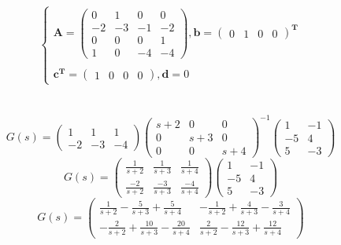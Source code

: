 \documentclass[UTF8,a4paper]{ctexart}
\begin{document}
\subsection{}
$$\begin{cases}
\mathbf{A}=\begin{pmatrix}
0&1&0&0\\
-2&-3&-1&-2\\
0&0&0&1\\
1&0&-4&-4\end{pmatrix},
\mathbf{b}=\begin{pmatrix} 0&1&0&0\end{pmatrix}^\mathbf{T} \\ \\ 
\mathbf{c}^\mathbf{T}=\begin{pmatrix} 1&0&0&0\end{pmatrix},
\mathbf{d}=0 \end{cases} $$
\section{}
$$G(s)=\begin{pmatrix} 1&1&1\\ -2&-3&-4\end{pmatrix}
\begin{pmatrix} s+2&0&0\\ 0&s+3&0\\ 0&0&s+4 \end{pmatrix}^{-1}
\begin{pmatrix} 1&-1\\ -5&4\\ 5&-3\end{pmatrix} $$ $$G(s) = \begin{pmatrix} \frac{1}{s+2}&\frac{1}{s+3}&\frac{1}{s+4}\\ \frac{-2}{s+2}&\frac{-3}{s+3}&\frac{-4}{s+4}\end{pmatrix}
\begin{pmatrix} 1&-1\\ -5&4\\ 5&-3\end{pmatrix}$$
$$G(s)=\begin{pmatrix} 
\frac{1}{s+2}-\frac{5}{s+3}+\frac{5}{s+4} & -\frac{1}{s+2}+\frac{4}{s+3}-\frac{3}{s+4} \\
-\frac{2}{s+2}+\frac{10}{s+3}-\frac{20}{s+4} & \frac{2}{s+2}-\frac{12}{s+3}+\frac{12}{s+4} \end{pmatrix}$$
\end{document}
